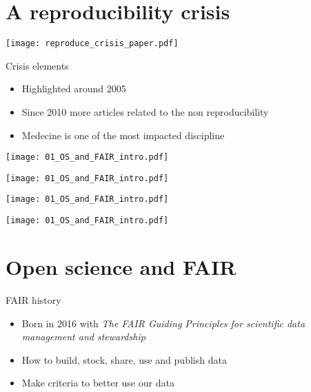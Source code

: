 \section{A reproducibility crisis}
\begin{frame}
\centering\texttt{[image: reproduce\_crisis\_paper.pdf]}
\end{frame}

\begin{frame}
\begin{block}{Crisis elements}
\begin{itemize}
\item Highlighted around 2005
\item Since 2010 more articles related to the non reproducibility
\item Medecine is one of the most impacted discipline
\end{itemize}
\end{block}
\end{frame}


\begin{frame}
\texttt{[image: 01\_OS\_and\_FAIR\_intro.pdf]}
\end{frame}

\begin{frame}
\texttt{[image: 01\_OS\_and\_FAIR\_intro.pdf]}
\end{frame}

\begin{frame}
\texttt{[image: 01\_OS\_and\_FAIR\_intro.pdf]}
\end{frame}

\begin{frame}
\texttt{[image: 01\_OS\_and\_FAIR\_intro.pdf]}
\end{frame}


\section{Open science and FAIR}

\begin{frame}
\begin{block}{FAIR history}
\begin{itemize}
\item Born in 2016 with \textit{The FAIR Guiding Principles for scientific data management and stewardship}
\item How to build, stock, share, use and publish data
\item Make criteria to better use our data
\end{itemize}
\end{block}
\end{frame}

